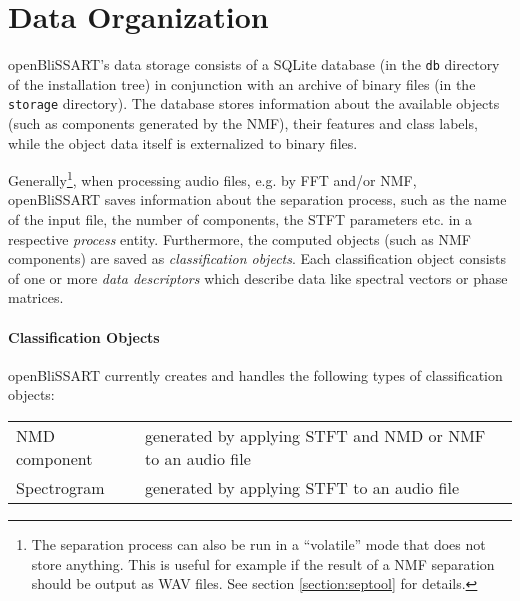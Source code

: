 %
%


\section{Data Organization}
\label{section:DataOrg}

openBliSSART's data storage consists of a SQLite database \cite{SQLite} (in the
{\tt db} directory of the installation tree) in conjunction with an archive of
binary files (in the {\tt storage} directory). The database stores information
about the available objects (such as components generated by the NMF), their
features and class labels, while the object data itself is externalized to
binary files.

Generally\footnote{The separation process can also be run in a ``volatile'' mode
  that does not store anything. This is useful for example if the result of a
  NMF separation should be output as WAV files. See section
  \ref{section:septool} for details.}, when processing audio files, e.g. by FFT
and/or NMF, openBliSSART saves information about the separation process, such as
the name of the input file, the number of components, the STFT parameters
etc. in a respective \emph{process} entity. Furthermore, the computed objects
(such as NMF components) are saved as \emph{classification objects}. Each
classification object consists of one or more \emph{data descriptors} which
describe data like spectral vectors or phase matrices.

\paragraph{Classification Objects} openBliSSART currently creates and handles
the following types of classification objects:
\begin{center}
  \begin{tabular}{|p{}|p{}|}
    \hline
    NMD component & generated by applying STFT and NMD or NMF
    to an audio file \\
    Spectrogram & generated by applying STFT to an audio file \\
    \hline
  \end{tabular}
\end{center}

